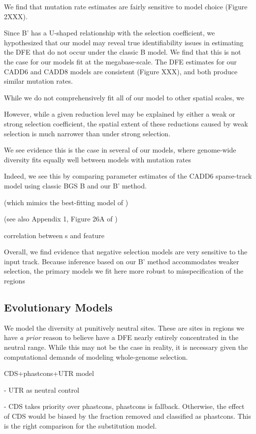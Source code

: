 \documentclass[11pt]{article}
\begin{document}
We find that mutation rate estimates are fairly sensitive to model choice
(Figure 2XXX). 

Since B' has a U-shaped relationship with the selection coefficient, we
hypothesized that our model may reveal true identifiability issues in
estimating the DFE that do not occur under the classic B model. We find that
this is not the case for our models fit at the megabase-scale. The DFE
estimates for our CADD6 and CADD8 models are consistent (Figure XXX), and both
produce similar mutation rates.

While we do not comprehensively fit all of our model to other spatial scales,
we 

However, while a given reduction level may be explained by either a weak or
strong selection coefficient, the spatial extent of these reductions caused by
weak selection is much narrower than under strong selection. 

We see evidence this is the case in several of our models, where
genome-wide diversity fits equally well between models with mutation rates 

Indeed, we see this by comparing parameter estimates of the CADD6
sparse-track model using classic BGS B and our B' method. 


(which mimics the best-fitting model of
\cite{Murphy2022-sj}) 

(see also
Appendix 1, Figure 26A of \cite{Murphy2022-sj})

correlation between s and feature

Overall, we find evidence that negative selection models are very sensitive to
the input track. Because inference based on our B' method accommodates weaker
selection, the primary models we fit here more robust to misspecification of
the regions

\subsection*{Evolutionary Models}

We model the diversity at punitively neutral sites. These are sites in regions
we have \emph{a prior} reason to believe have a DFE nearly entirely
concentrated in the neutral range. While this may not be the case in reality,
it is necessary given the computational demands of modeling whole-genome
selection. 

CDS+phastcons+UTR model

 - UTR as neutral control

 - CDS takes priority over phastcons, phastcons is fallback. Otherwise, the
   effect of CDS would be biased by the fraction removed and classified as
   phastcons. This is the right comparison for the substitution model.
\end{document}
